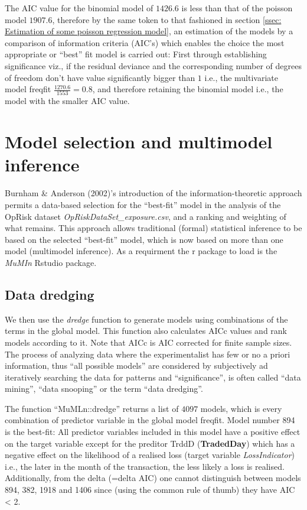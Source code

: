 \documentclass{DissertateUSU}
\begin{document}
The AIC value for the binomial model of \(1426.6\) is less than that of
the poisson model \(1907.6\), therefore by the same token to that
fashioned in section
\ref{ssec: Estimation of some poisson regression model}, an estimation
of the models by a comparison of information criteria (AIC's) which
enables the choice the most appropriate or ``best'' fit model is carried
out: First through establishing significance viz., if the residual
deviance and the corresponding number of degrees of freedom don't have
value significantly bigger than \(1\) i.e., the multivariate model
freqfit \(\frac{1270.6}{1553} = 0.8\), and therefore retaining the
binomial model i.e., the model with the smaller AIC value.

\section{Model selection and multimodel inference}

Burnham \& Anderson (2002)'s introduction of the information-theoretic
approach permits a data-based selection for the ``best-fit'' model in
the analysis of the OpRisk dataset \emph{OpRiskDataSet\_exposure.csv},
and a ranking and weighting of what remains. This approach allows
traditional (formal) statistical inference to be based on the selected
``best-fit'' model, which is now based on more than one model
(multimodel inference). As a requirment the r package to load is the
\emph{MuMIn} Rstudio package. \medskip

\singlespacing

\doublespacing

\subsection{Data dredging}

We then use the \emph{dredge} function to generate models using
combinations of the terms in the global model. This function also
calculates AICc values and rank models according to it. Note that AICc
is AIC corrected for finite sample sizes. The process of analyzing data
where the experimentalist has few or no a priori information, thus ``all
possible models'' are considered by subjectively ad iteratively
searching the data for patterns and ``significance'', is often called
``data mining'', ``data snooping'' or the term ``data dredging''.

\singlespacing

\doublespacing

The function ``MuMLn::dredge'' returns a list of \(4097\) models, which
is every combination of predictor variable in the global model freqfit.
Model number 894 is the best-fit: All predictor variables included in
this model have a positive effect on the target variable except for the
preditor TrddD (\textbf{TradedDay}) which has a negative effect on the
likelihood of a realised loss (target variable \emph{LossIndicator})
i.e., the later in the month of the transaction, the less likely a loss
is realised. Additionally, from the delta (=delta AIC) one cannot
distinguish between models 894, 382, 1918 and 1406 since (using the
common rule of thumb) they have AIC \textless{} 2.\medskip
\end{document}
